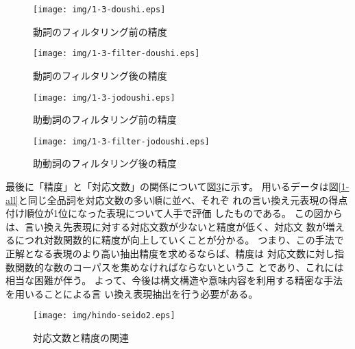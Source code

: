 \documentclass[jnlpbbl]{jnlp_j}
\begin{document}
\begin{figure}[htbp]
 \begin{minipage}{0.5\hsize}
  \begin{center}
   \texttt{[image: img/1-3-doushi.eps]}
  \end{center}
  \caption{動詞のフィルタリング前の精度}
  \label{1-3-doushi}
 \end{minipage}
 \begin{minipage}{0.5\hsize}
  \begin{center}
   \texttt{[image: img/1-3-filter-doushi.eps]}
  \end{center}
  \caption{動詞のフィルタリング後の精度}
  \label{1-3-filter-doushi}
 \end{minipage}
\end{figure}

\begin{figure}[htbp]
 \begin{minipage}{0.5\hsize}
  \begin{center}
   \texttt{[image: img/1-3-jodoushi.eps]}
  \end{center}
  \caption{助動詞のフィルタリング前の精度}
  \label{1-3-jodoushi}
 \end{minipage}
 \begin{minipage}{0.5\hsize}
  \begin{center}
   \texttt{[image: img/1-3-filter-jodoushi.eps]}
  \end{center}
  \caption{助動詞のフィルタリング後の精度}
  \label{1-3-filter-jodoushi}
 \end{minipage}
\end{figure}

最後に「精度」と「対応文数」の関係について図\ref{hindo-seido}に示す。
用いるデータは図\ref{1-all}と同じ全品詞を対応文数の多い順に並べ、それぞ
れの言い換え元表現の得点付け順位が1位になった表現について人手で評価
したものである。
この図からは、言い換え先表現に対する対応文数が少ないと精度が低く、対応文
数が増えるにつれ対数関数的に精度が向上していくことが分かる。
つまり、この手法で正解となる表現のより高い抽出精度を求めるならば、精度は
対応文数に対し指数関数的な数のコーパスを集めなければならないというこ
とであり、これには相当な困難が伴う。
よって、今後は構文構造や意味内容を利用する精密な手法を用いることによる言
い換え表現抽出を行う必要がある。

\begin{figure}[htbp]
 \begin{center}
  \texttt{[image: img/hindo-seido2.eps]}
 \end{center}
 \caption{対応文数と精度の関連}
 \label{hindo-seido}
\end{figure}
\end{document}
